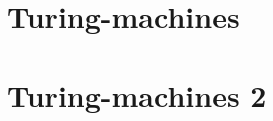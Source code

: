 \documentclass[14pt,a4paper]{article}
\begin{document}
\setcounter{section}{5}

\section{Turing-machines}
\pagebreak
\pagebreak
\pagebreak
\pagebreak
\pagebreak
\pagebreak
\pagebreak
\pagebreak
\pagebreak


\section{Turing-machines 2}
\pagebreak
\pagebreak
\pagebreak
\pagebreak
\pagebreak
\pagebreak
\pagebreak
\pagebreak
\end{document}
